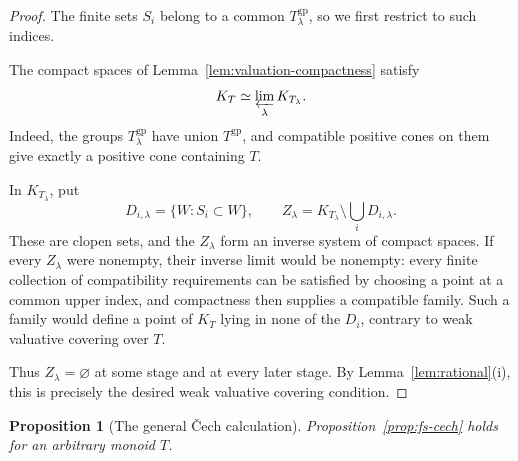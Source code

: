 \documentclass[11pt]{article}
\newtheorem{proposition}[theorem]{Proposition}
\theoremstyle{definition}
\theoremstyle{remark}
\newcommand{\gp}{\mathrm{gp}}
\begin{document}
\begin{proof}
The finite sets \(S_i\) belong to a common \(T_\lambda^{\gp}\), so
we first restrict to such indices.

The compact spaces of Lemma~\ref{lem:valuation-compactness}
satisfy
\[
K_T\simeq\varprojlim_\lambda K_{T_\lambda}.
\]
Indeed, the groups \(T_\lambda^{\gp}\) have union \(T^{\gp}\),
and compatible positive cones on them give exactly a positive
cone containing \(T\).

In \(K_{T_\lambda}\), put
\[
D_{i,\lambda}=\{W:S_i\subset W\},
\qquad
Z_\lambda=K_{T_\lambda}\setminus\bigcup_iD_{i,\lambda}.
\]
These are clopen sets, and the \(Z_\lambda\) form an inverse
system of compact spaces. If every \(Z_\lambda\) were nonempty,
their inverse limit would be nonempty: every finite collection
of compatibility requirements can be satisfied by choosing a
point at a common upper index, and compactness then supplies a
compatible family. Such a family would define a point of
\(K_T\) lying in none of the \(D_i\), contrary to weak valuative
covering over \(T\).

Thus \(Z_\lambda=\varnothing\) at some stage and at every later
stage. By Lemma~\ref{lem:rational}(i), this is precisely the
desired weak valuative covering condition.
\end{proof}

\begin{proposition}[The general \v{C}ech calculation]\label{prop:general-cech}
Proposition~\ref{prop:fs-cech} holds for an arbitrary monoid \(T\).
\end{proposition}

\end{document}
